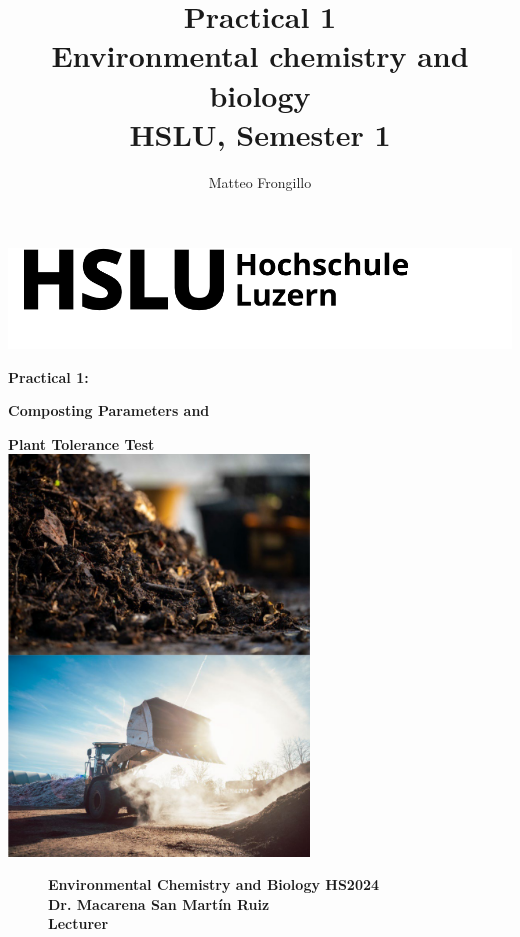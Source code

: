 \documentclass{article}
\title{\textbf{Practical 1 \\ Environmental chemistry and biology \\ HSLU, Semester 1}}
\author{Matteo Frongillo}
\begin{document}
\begin{minipage}{0.7\textwidth}
    \vspace*{-.8cm} \hspace*{-0.3cm}
    \includegraphics[width=.5\textwidth]{media/hslu-logo.png}
\end{minipage}

\vspace*{2cm}

\textbf{\huge Practical 1:}\\[.75cm]
\begin{center}
    \textbf{\huge Composting Parameters and}
    
    \textbf{\huge Plant Tolerance Test}\\[1cm]
    
    \includegraphics[width=0.6\textwidth]{media/front_practical1.png}\\
\end{center}

\vspace*{1cm}

\setlength{\intextsep}{0pt}%
\begin{figure}
    \textbf{\Large Environmental Chemistry and Biology HS2024\\[.5cm]
    \large Dr. Macarena San Martín Ruiz\\
    Lecturer}
    \vspace{-2.1cm}
\end{figure}
\end{document}
